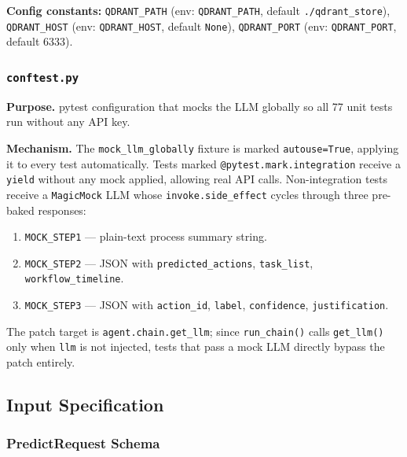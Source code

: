 \documentclass[12pt,a4paper]{article}
\begin{document}
\textbf{Config constants:} \texttt{QDRANT\_PATH} (env: \texttt{QDRANT\_PATH},
default \texttt{./qdrant\_store}), \texttt{QDRANT\_HOST} (env: \texttt{QDRANT\_HOST},
default \texttt{None}), \texttt{QDRANT\_PORT} (env: \texttt{QDRANT\_PORT}, default 6333).

\subsubsection{\texttt{conftest.py}}

\textbf{Purpose.} pytest configuration that mocks the LLM globally so all 77 unit
tests run without any API key.

\textbf{Mechanism.} The \texttt{mock\_llm\_globally} fixture is marked
\texttt{autouse=True}, applying it to every test automatically. Tests marked
\texttt{@pytest.mark.integration} receive a \texttt{yield} without any mock applied,
allowing real API calls. Non-integration tests receive a \texttt{MagicMock} LLM whose
\texttt{invoke.side\_effect} cycles through three pre-baked responses:

\begin{enumerate}[nosep]
  \item \texttt{MOCK\_STEP1} --- plain-text process summary string.
  \item \texttt{MOCK\_STEP2} --- JSON with \texttt{predicted\_actions},
    \texttt{task\_list}, \texttt{workflow\_timeline}.
  \item \texttt{MOCK\_STEP3} --- JSON with \texttt{action\_id}, \texttt{label},
    \texttt{confidence}, \texttt{justification}.
\end{enumerate}

The patch target is \texttt{agent.chain.get\_llm}; since \texttt{run\_chain()} calls
\texttt{get\_llm()} only when \texttt{llm} is not injected, tests that pass a mock
LLM directly bypass the patch entirely.

\subsection{Input Specification}

\subsubsection{PredictRequest Schema}
\end{document}
